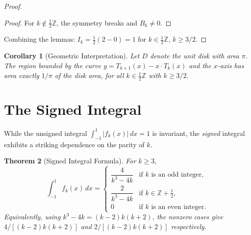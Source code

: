 \documentclass[11pt]{article}
\newtheorem{theorem}{Theorem}
\newtheorem{corollary}[theorem]{Corollary}
\begin{document}
\begin{proof}
\begin{proof}
For $k \notin \tfrac{1}{2}\mathbb{Z}$, the symmetry breaks and $B_k \neq 0$.
\end{proof}

Combining the lemmas: $I_k = \frac{1}{2}(2 - 0) = 1$ for $k \in \tfrac{1}{2}\mathbb{Z}$, $k \geq 3/2$.
\end{proof}

\begin{corollary}[Geometric Interpretation]
Let $D$ denote the unit disk with area $\pi$. The region bounded by the curve
$y = T_{k+1}(x) - x \cdot T_k(x)$ and the $x$-axis has area exactly $1/\pi$ of
the disk area, for all $k \in \tfrac{1}{2}\mathbb{Z}$ with $k \geq 3/2$.
\end{corollary}

\section{The Signed Integral}

While the unsigned integral $\int_{-1}^{1}|f_k(x)|\,dx = 1$ is invariant,
the \emph{signed} integral exhibits a striking dependence on the parity of $k$.

\begin{theorem}[Signed Integral Formula]\label{thm:signed}
For $k \geq 3$,
\[
\int_{-1}^{1} f_k(x) \, dx =
\begin{cases}
\dfrac{4}{k^3 - 4k} & \text{if } k \text{ is an odd integer}, \\[2mm]
\dfrac{2}{k^3 - 4k} & \text{if } k \in \mathbb{Z} + \tfrac{1}{2}, \\[2mm]
0 & \text{if } k \text{ is an even integer}.
\end{cases}
\]
Equivalently, using $k^3 - 4k = (k-2)k(k+2)$, the nonzero cases give
$4/[(k-2)k(k+2)]$ and $2/[(k-2)k(k+2)]$ respectively.
\end{theorem}
\end{document}
